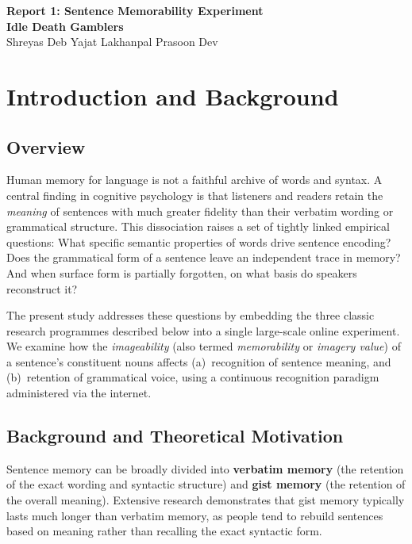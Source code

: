 \documentclass[12pt, a4paper]{article}
\begin{document}
\begin{center}
  \vspace*{-3.5em}
  {\Large \textbf{Report 1: Sentence Memorability Experiment}}\\[6pt]
  {\normalsize \textbf{Idle Death Gamblers}}\\[2pt]
  {\small Shreyas Deb \quad Yajat Lakhanpal \quad Prasoon Dev}
\end{center}
\vspace{0.5em}

\section{Introduction and Background}

\subsection{Overview}

Human memory for language is not a faithful archive of words and
syntax. A central finding in cognitive psychology is that listeners
and readers retain the \emph{meaning} of sentences with much greater
fidelity than their verbatim wording or grammatical structure.
This dissociation raises a set of tightly linked empirical questions:
What specific semantic properties of words drive sentence encoding?
Does the grammatical form of a sentence leave an independent trace in
memory? And when surface form is partially forgotten, on what basis do
speakers reconstruct it?

The present study addresses these questions by embedding the three
classic research programmes described below into a single large-scale
online experiment. We examine how the \emph{imageability} (also termed
\emph{memorability} or \emph{imagery value}) of a sentence's constituent
nouns affects (a)~recognition of sentence meaning, and (b)~retention of
grammatical voice, using a continuous recognition paradigm administered
via the internet.

\subsection{Background and Theoretical Motivation}

Sentence memory can be broadly divided into \textbf{verbatim memory} (the retention of the exact wording and syntactic structure) and \textbf{gist memory} (the retention of the overall meaning). Extensive research demonstrates that gist memory typically lasts much longer than verbatim memory, as people tend to rebuild sentences based on meaning rather than recalling the exact syntactic form.
\end{document}
